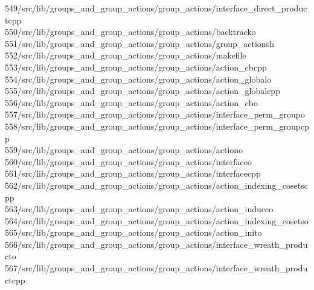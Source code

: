 \begin{tabbing}
549\>/src/lib/groups\_and\_group\_actions/group\_actions/interface\_direct\_productcpp\\[0pt]
550\>/src/lib/groups\_and\_group\_actions/group\_actions/backtracko\\[0pt]
551\>/src/lib/groups\_and\_group\_actions/group\_actions/group\_actionsh\\[0pt]
552\>/src/lib/groups\_and\_group\_actions/group\_actions/makefile\\[0pt]
553\>/src/lib/groups\_and\_group\_actions/group\_actions/action\_cbcpp\\[0pt]
554\>/src/lib/groups\_and\_group\_actions/group\_actions/action\_globalo\\[0pt]
555\>/src/lib/groups\_and\_group\_actions/group\_actions/action\_globalcpp\\[0pt]
556\>/src/lib/groups\_and\_group\_actions/group\_actions/action\_cbo\\[0pt]
557\>/src/lib/groups\_and\_group\_actions/group\_actions/interface\_perm\_groupo\\[0pt]
558\>/src/lib/groups\_and\_group\_actions/group\_actions/interface\_perm\_groupcpp\\[0pt]
559\>/src/lib/groups\_and\_group\_actions/group\_actions/actiono\\[0pt]
560\>/src/lib/groups\_and\_group\_actions/group\_actions/interfaceo\\[0pt]
561\>/src/lib/groups\_and\_group\_actions/group\_actions/interfacecpp\\[0pt]
562\>/src/lib/groups\_and\_group\_actions/group\_actions/action\_indexing\_cosetscpp\\[0pt]
563\>/src/lib/groups\_and\_group\_actions/group\_actions/action\_induceo\\[0pt]
564\>/src/lib/groups\_and\_group\_actions/group\_actions/action\_indexing\_cosetso\\[0pt]
565\>/src/lib/groups\_and\_group\_actions/group\_actions/action\_inito\\[0pt]
566\>/src/lib/groups\_and\_group\_actions/group\_actions/interface\_wreath\_producto\\[0pt]
567\>/src/lib/groups\_and\_group\_actions/group\_actions/interface\_wreath\_productcpp\\[0pt]

\end{tabbing}
